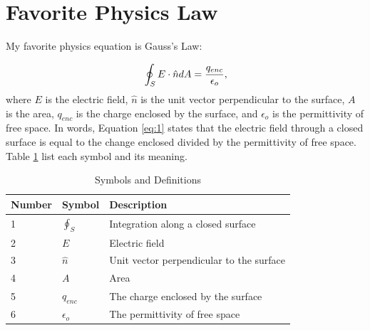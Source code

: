 \documentclass[12pt, letterpaper]{article} %
\begin{document}
\section{Favorite Physics Law} %
My favorite physics equation is Gauss's Law:

    \begin{equation}  %
       \label{eq:1}  %
        \\ %
        \oint_S E\cdot \hat{n} dA=\frac{q_{enc}}{\epsilon_o},
    \end{equation} %
where $E$ is the electric field, $\hat{n}$ is the unit vector perpendicular to the surface, $A$ is the area, $q_{enc}$ is the charge enclosed by the surface, and $\epsilon_o$ is the permittivity of free space. %
In words, Equation \ref{eq:1} %
states that the electric field through a closed surface is equal to the change enclosed divided by the permittivity of free space. 
Table \ref{tab:1} list each symbol and its meaning.

\begin{table}[!h] %
    \begin{center} %
      \begin{tabular}{l|l|l}  %
        \hline %
        Number & Symbol & Description\\  %
        \hline\hline  %
        1 & $\oint_S$ & Integration along a closed surface\\ 
        2 & $E$ & Electric field\\ 
        3 & $\hat{n}$ & Unit vector perpendicular to the surface\\ 
        4 & $A$ & Area\\
        5 & $q_{enc}$ & The charge enclosed by the surface\\
        6 & $\epsilon_o$ & The permittivity of free space\\
        \hline %
     \end{tabular} %
     \caption{Symbols and Definitions} %
     \label{tab:1} %
    \end{center} %
\end{table} %
\end{document}
